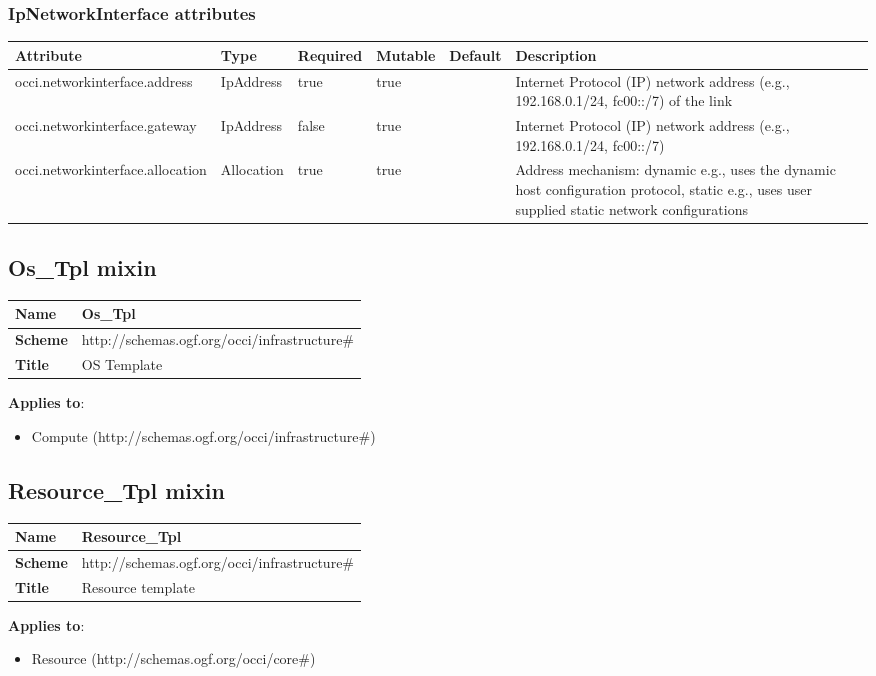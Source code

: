 \documentclass{article}
\begin{document}
\subsubsection{IpNetworkInterface attributes}
\begin{tabularx}{\textwidth}{|l|l|p{1.4cm}|p{1.3cm}|l|X|}
  \hline
  \textbf{Attribute} & \textbf{Type} & \textbf{Required} & \textbf{Mutable} & \textbf{Default} & \textbf{Description} \\
  \hline  
  occi.networkinterface.address & IpAddress & true & true &  & Internet Protocol (IP) network address (e.g., 192.168.0.1/24, fc00::/7) of the link \\
  \hline
  occi.networkinterface.gateway & IpAddress & false & true &  & Internet Protocol (IP) network address (e.g., 192.168.0.1/24, fc00::/7) \\
  \hline
  occi.networkinterface.allocation & Allocation & true & true &  & Address mechanism: dynamic e.g., uses the dynamic host configuration protocol, static e.g., uses user supplied static network configurations \\
  \hline
\end{tabularx}


\subsection{Os\_Tpl mixin}
\begin{center}
\begin{tabular}{|l|l|}
  \hline
  \textbf{Name} & Os\_Tpl \\
  \hline  
  \textbf{Scheme} & http://schemas.ogf.org/occi/infrastructure\# \\
  \hline
  \textbf{Title} & OS Template \\
  \hline
\end{tabular}
\end{center}
\textbf{Applies to}:
\begin{itemize}
	\item Compute (http://schemas.ogf.org/occi/infrastructure\#)
\end{itemize}



\subsection{Resource\_Tpl mixin}
\begin{center}
\begin{tabular}{|l|l|}
  \hline
  \textbf{Name} & Resource\_Tpl \\
  \hline  
  \textbf{Scheme} & http://schemas.ogf.org/occi/infrastructure\# \\
  \hline
  \textbf{Title} & Resource template \\
  \hline
\end{tabular}
\end{center}
\textbf{Applies to}:
\begin{itemize}
	\item Resource (http://schemas.ogf.org/occi/core\#)
\end{itemize}
\end{document}
